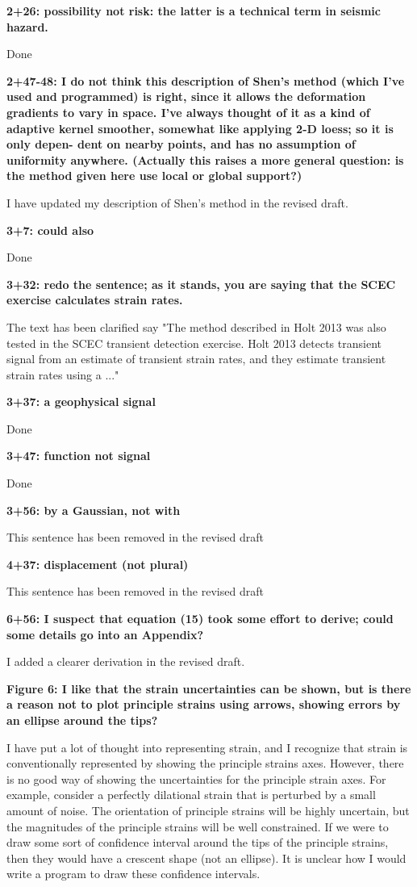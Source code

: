 \documentclass[10pt,a4paper]{letter}
\begin{document}
\begin{letter}{}
\textbf{2+26: possibility not risk: the latter is a technical term in seismic
hazard.}

Done

\textbf{2+47-48: I do not think this description of Shen’s method (which I’ve
used and programmed) is right, since it allows the deformation
gradients to vary in space. I’ve always thought of it as a kind of
adaptive kernel smoother, somewhat like applying 2-D loess; so it is
only depen- dent on nearby points, and has no assumption of uniformity
anywhere. (Actually this raises a more general question: is the method
given here use local or global support?)}

I have updated my description of Shen's method in the revised draft.

\textbf{3+7: could also}

Done 

\textbf{3+32: redo the sentence; as it stands, you are saying that the SCEC
exercise calculates strain rates.}

The text has been clarified say "The method described in Holt 2013 was
also tested in the SCEC transient detection exercise. Holt 2013
detects transient signal from an estimate of transient strain rates,
and they estimate transient strain rates using a ..."

\textbf{3+37: a geophysical signal}

Done

\textbf{3+47: function not signal}

Done

\textbf{3+56: by a Gaussian, not with}

This sentence has been removed in the revised draft

\textbf{4+37: displacement (not plural)}

This sentence has been removed in the revised draft

\textbf{6+56: I suspect that equation (15) took some effort to derive; could
some details go into an Appendix?}

I added a clearer derivation in the revised draft.

\textbf{Figure 6: I like that the strain uncertainties can be shown, but is
there a reason not to plot principle strains using arrows, showing
errors by an ellipse around the tips?}

I have put a lot of thought into representing strain, and I recognize
that strain is conventionally represented by showing the principle
strains axes. However, there is no good way of showing the
uncertainties for the principle strain axes. For example, consider a
perfectly dilational strain that is perturbed by a small amount of
noise. The orientation of principle strains will be highly uncertain,
but the magnitudes of the principle strains will be well constrained.
If we were to draw some sort of confidence interval around the tips of
the principle strains, then they would have a crescent shape (not an
ellipse). It is unclear how I would write a program to draw these
confidence intervals.


\end{letter}
\end{document}
